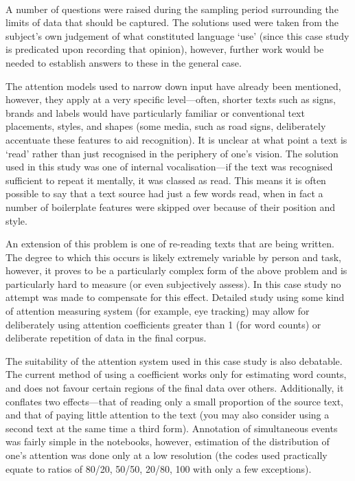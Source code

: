 \paragraph{}
A number of questions were raised during the sampling period surrounding the limits of data that should be captured.  The solutions used were taken from the subject's own judgement of what constituted language `use' (since this case study is predicated upon recording that opinion), however, further work would be needed to establish answers to these in the general case.


The attention models used to narrow down input have already been mentioned, however, they apply at a very specific level---often, shorter texts such as signs, brands and labels would have particularly familiar or conventional text placements, styles, and shapes (some media, such as road signs, deliberately accentuate these features to aid recognition).  It is unclear at what point a text is `read' rather than just recognised in the periphery of one's vision.  The solution used in this study was one of internal vocalisation---if the text was recognised sufficient to repeat it mentally, it was classed as read.  This means it is often possible to say that a text source had just a few words read, when in fact a number of boilerplate features were skipped over because of their position and style.


An extension of this problem is one of re-reading texts that are being written.  The degree to which this occurs is likely extremely variable by person and task, however, it proves to be a particularly complex form of the above problem and is particularly hard to measure (or even subjectively assess).  In this case study no attempt was made to compensate for this effect.  Detailed study using some kind of attention measuring system (for example, eye tracking) may allow for deliberately using attention coefficients greater than 1 (for word counts) or deliberate repetition of data in the final corpus.


The suitability of the attention system used in this case study is also debatable.  The current method of using a coefficient works only for estimating word counts, and does not favour certain regions of the final data over others.  Additionally, it conflates two effects---that of reading only a small proportion of the source text, and that of paying little attention to the text (you may also consider using a second text at the same time a third form).  Annotation of simultaneous events was fairly simple in the notebooks, however, estimation of the distribution of one's attention was done only at a low resolution (the codes used practically equate to ratios of 80/20, 50/50, 20/80, 100 with only a few exceptions).



